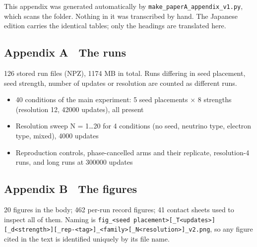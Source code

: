 \documentclass[
]{article}
\providecommand{\tightlist}{%
  \setlength{\itemsep}{0pt}\setlength{\parskip}{0pt}}
\begin{document}
This appendix was generated automatically by
\texttt{make\_paperA\_appendix\_v1.py}, which scans the folder. Nothing
in it was transcribed by hand. The Japanese edition carries the
identical tables; only the headings are translated here.

\subsection{Appendix A　The runs}\label{appendix-a-the-runs}

126 stored run files (NPZ), 1174 MB in total. Runs differing in seed
placement, seed strength, number of updates or resolution are counted as
different runs.

\begin{itemize}
\tightlist
\item
  40 conditions of the main experiment: 5 seed placements × 8 strengths
  (resolution 12, 42000 updates), all present
\item
  Resolution sweep N = 1\ldots20 for 4 conditions (no seed, neutrino
  type, electron type, mixed), 4000 updates
\item
  Reproduction controls, phase-cancelled arms and their replicate,
  resolution-4 runs, and long runs at 300000 updates
\end{itemize}

\subsection{Appendix B　The figures}\label{appendix-b-the-figures}

20 figures in the body; 462 per-run record figures; 41 contact sheets
used to inspect all of them. Naming is
\texttt{fig\_\textless{}seed\ placement\textgreater{}{[}\_T\textless{}updates\textgreater{}{]}{[}\_d\textless{}strength\textgreater{}{]}{[}\_rep-\textless{}tag\textgreater{}{]}\_\textless{}family\textgreater{}{[}\_N\textless{}resolution\textgreater{}{]}\_v2.png},
so any figure cited in the text is identified uniquely by its file name.
\end{document}
